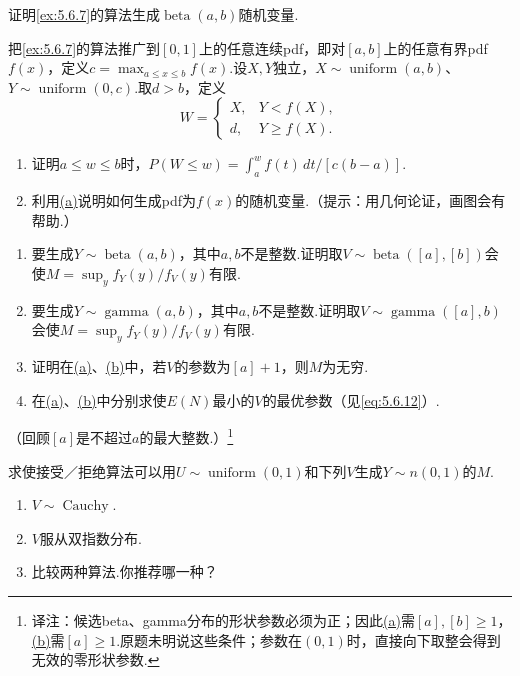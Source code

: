 \begin{exercise}\label{exercise:5.59}
证明\autoref{ex:5.6.7}的算法生成$\operatorname{beta}(a,b)$随机变量.
\end{exercise}
\begin{exercise}\label{exercise:5.60}
把\autoref{ex:5.6.7}的算法推广到$[0,1]$上的任意连续pdf，即对$[a,b]$上的任意有界pdf $f(x)$，定义$c=\max_{a\le x\le b}f(x)$.设$X,Y$独立，$X\sim\operatorname{uniform}(a,b)$、$Y\sim\operatorname{uniform}(0,c)$.取$d>b$，定义
$$W=\begin{cases}X,&Y<f(X),\\d,&Y\ge f(X).\end{cases}$$
\begin{enumerate}[label=(\alph*)]\item{}\label{itm:exercise:5.60:a} 证明$a\le w\le b$时，$P(W\le w)=\int_a^w f(t)\,dt/[c(b-a)]$.\item 利用\hyperref[itm:exercise:5.60:a]{(a)}说明如何生成pdf为$f(x)$的随机变量.（提示：用几何论证，画图会有帮助.）\end{enumerate}
\end{exercise}
\begin{exercise}\label{exercise:5.61}\leavevmode
\begin{enumerate}[label=(\alph*)]
\item{}\label{itm:exercise:5.61:a} 要生成$Y\sim\operatorname{beta}(a,b)$，其中$a,b$不是整数.证明取$V\sim\operatorname{beta}([a],[b])$会使$M=\sup_y f_Y(y)/f_V(y)$有限.
\item{}\label{itm:exercise:5.61:b} 要生成$Y\sim\operatorname{gamma}(a,b)$，其中$a,b$不是整数.证明取$V\sim\operatorname{gamma}([a],b)$会使$M=\sup_y f_Y(y)/f_V(y)$有限.
\item 证明在\hyperref[itm:exercise:5.61:a]{(a)}、\hyperref[itm:exercise:5.61:b]{(b)}中，若$V$的参数为$[a]+1$，则$M$为无穷.
\item 在\hyperref[itm:exercise:5.61:a]{(a)}、\hyperref[itm:exercise:5.61:b]{(b)}中分别求使$E(N)$最小的$V$的最优参数（见\eqref{eq:5.6.12}）.
\end{enumerate}
（回顾$[a]$是不超过$a$的最大整数.）\footnote{译注：候选beta、gamma分布的形状参数必须为正；因此\hyperref[itm:exercise:5.61:a]{(a)}需$[a],[b]\ge1$，\hyperref[itm:exercise:5.61:b]{(b)}需$[a]\ge1$.原题未明说这些条件；参数在$(0,1)$时，直接向下取整会得到无效的零形状参数.}
\end{exercise}
\begin{exercise}\label{exercise:5.62}
求使接受／拒绝算法可以用$U\sim\operatorname{uniform}(0,1)$和下列$V$生成$Y\sim n(0,1)$的$M$.
\begin{enumerate}[label=(\alph*)]\item $V\sim\operatorname{Cauchy}$.\item $V$服从双指数分布.\item 比较两种算法.你推荐哪一种？\end{enumerate}
\end{exercise}
